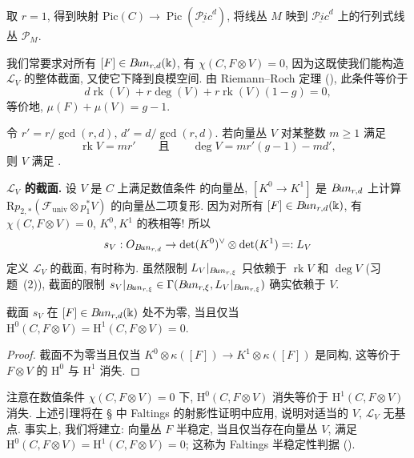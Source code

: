 \begin{remark}[秩 \texorpdfstring{$r=1$}{r=1} 的情形]\label{src:9.4.18}
取 $r=1$, 得到映射 $\mathrm{Pic}(C)\to\operatorname{Pic}(\underline{\mathcal P\!ic}^d)$, 将线丛 $M$ 映到 $\underline{\mathcal P\!ic}^d$ 上的行列式线丛 $\mathcal P_M$.
\end{remark}
\begin{remark}\label{src:9.4.19}
我们常要求对所有 $[F]\in B\!un_{r,d}(\Bbbk)$, 有 $\chi(C,F\otimes V)=0$, 因为这既使我们能构造 $\mathcal L_V$ 的整体截面, 又使它下降到良模空间. 由 Riemann--Roch 定理 (), 此条件等价于
\begin{equation}\label{src:9.4.20}
d\operatorname{rk}(V)+r\deg(V)+r\operatorname{rk}(V)(1-g)=0,
\end{equation}
等价地, $\mu(F)+\mu(V)=g-1$.

令 $r'=r/\gcd(r,d)$, $d'=d/\gcd(r,d)$. 若向量丛 $V$ 对某整数 $m\geq1$ 满足
\[
\operatorname{rk}V=mr'\qquad\text{且}\qquad\deg V=mr'(g-1)-md',
\]
则 $V$ 满足 .
\end{remark}
\textbf{$\mathcal L_V$ 的截面.} 设 $V$ 是 $C$ 上满足数值条件  的向量丛, $[K^0\to K^1]$ 是 $B\!un_{r,d}$ 上计算 $\mathrm Rp_{2,*}(\mathcal F_{\mathrm{univ}}\otimes p_1^*V)$ 的向量丛二项复形. 因为对所有 $[F]\in B\!un_{r,d}(\Bbbk)$, 有 $\chi(C,F\otimes V)=0$, $K^0,K^1$ 的秩相等! 所以
\begin{equation}\label{src:9.4.21}
s_V:O_{B\!un_{r,d}}\to\det(K^0)^\vee\otimes\det(K^1)=:L_V
\end{equation}
定义 $\mathcal L_V$ 的截面, 有时称为. 虽然限制 $L_V|_{B\!un_{r,\xi}}$ 只依赖于 $\operatorname{rk}V$ 和 $\deg V$ (习题~(2)), 截面的限制 $s_V|_{B\!un_{r,\xi}}\in\Gamma(B\!un_{r,\xi},L_V|_{B\!un_{r,\xi}})$ 确实依赖于 $V$.
\begin{lemma}\label{src:9.4.22}
截面 $s_V$ 在 $[F]\in B\!un_{r,d}(\Bbbk)$ 处不为零, 当且仅当 $\mathrm H^0(C,F\otimes V)=\mathrm H^1(C,F\otimes V)=0$.
\end{lemma}
\begin{proof}
截面不为零当且仅当 $K^0\otimes\kappa([F])\to K^1\otimes\kappa([F])$ 是同构, 这等价于 $F\otimes V$ 的 $\mathrm H^0$ 与 $\mathrm H^1$ 消失.
\end{proof}
\begin{remark}\label{src:9.4.23}
注意在数值条件 $\chi(C,F\otimes V)=0$ 下, $\mathrm H^0(C,F\otimes V)$ 消失等价于 $\mathrm H^1(C,F\otimes V)$ 消失. 上述引理将在 \S{} 中 Faltings 的射影性证明中应用, 说明对适当的 $V$, $\mathcal L_V$ 无基点. 事实上, 我们将建立: 向量丛 $F$ 半稳定, 当且仅当存在向量丛 $V$, 满足 $\mathrm H^0(C,F\otimes V)=\mathrm H^1(C,F\otimes V)=0$; 这称为 Faltings 半稳定性判据 ().
\end{remark}
